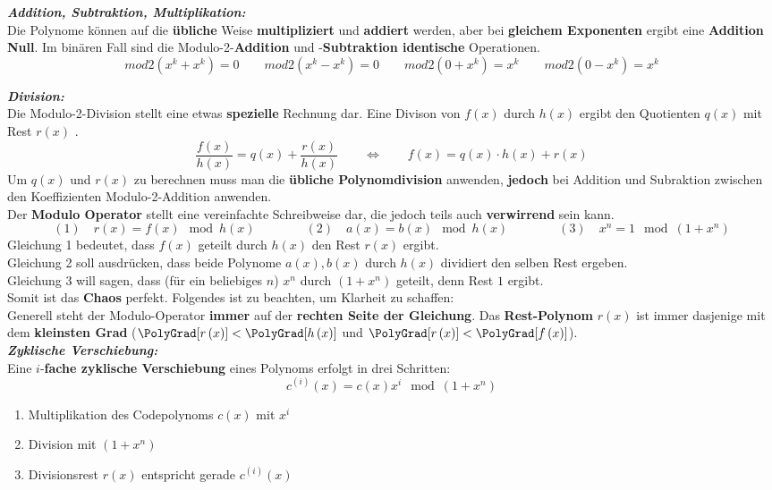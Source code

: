 \textbf{\textit{Addition, Subtraktion, Multiplikation:}} \\
Die Polynome können auf die \textbf{übliche} Weise \textbf{multipliziert} und \textbf{addiert} werden, aber bei \textbf{gleichem Exponenten} ergibt eine \textbf{Addition Null}. Im binären Fall sind die Modulo-2-\textbf{Addition} und
-\textbf{Subtraktion identische} Operationen. 
$$ mod2(x^k + x^k) = 0 \qquad mod2(x^k - x^k) = 0 \qquad mod2(0 + x^k) = x^k \qquad mod2(0 - x^k) = x^k$$

\textbf{\textit{Division:}}\\
Die Modulo-2-Division stellt eine etwas \textbf{spezielle} Rechnung dar.
Eine Divison von \boldmath$f(x)$ durch $h(x)$ ergibt den Quotienten $q(x)$ mit Rest $r(x)$
\unboldmath . 
$$ \dfrac{f(x)}{h(x)} = q(x) + \dfrac{r(x)}{h(x)} \qquad \Longleftrightarrow \qquad \boxed{f(x) = q(x)
\cdot h(x) + r(x)}$$ 
Um $q(x)$ und $r(x)$ zu berechnen muss man die \textbf{übliche Polynomdivision} anwenden, \textbf{jedoch}
bei Addition und Subraktion zwischen den Koeffizienten Modulo-2-Addition anwenden. \\ 
Der \textbf{Modulo Operator} stellt eine vereinfachte Schreibweise dar, die jedoch teils auch
\textbf{verwirrend} sein kann.
$$ (1) \quad r(x) = f(x) \mod{h(x)} \qquad \qquad 
(2) \quad a(x) = b(x) \mod{h(x)} \qquad \qquad 
(3) \quad x^n = 1 \mod{(1 + x^n)}$$
Gleichung 1 bedeutet, dass $f(x)$ geteilt durch $h(x)$ den Rest $r(x)$ ergibt. \\
Gleichung 2 soll ausdrücken, dass beide Polynome $a(x), b(x)$ durch $h(x)$ dividiert den selben
Rest ergeben. \\
Gleichung 3 will sagen, dass (für ein beliebiges $n$) $x^n$ durch $(1 + x^n)$ geteilt, denn Rest
$1$ ergibt. \\
Somit ist das \textbf{Chaos} perfekt. Folgendes ist zu beachten, um Klarheit zu schaffen:\\
Generell steht der Modulo-Operator \textbf{immer} auf der \textbf{rechten Seite der Gleichung}. 
Das \textbf{Rest-Polynom} $r(x)$ ist immer dasjenige mit dem \textbf{kleinsten Grad
}($\PolyGrad[r \left( x \right)] < \PolyGrad[h \left(x \right)]$ und
$\PolyGrad[r \left(x \right) ] < \PolyGrad[f \left( x \right)]$).
\\

\textbf{\textit{Zyklische Verschiebung:}} \\
Eine $i$-\textbf{fache zyklische Verschiebung} eines Polynoms erfolgt in drei Schritten:
$$ c^{(i)}(x) = c(x) x^i \mod{(1+x^n)}$$
\begin{enumerate}
  \item Multiplikation des Codepolynoms $c(x)$ mit $x^i$
  \item Division mit $(1+x^n)$
  \item Divisionsrest $r(x)$ entspricht gerade $c^{(i)}(x)$
\end{enumerate}

